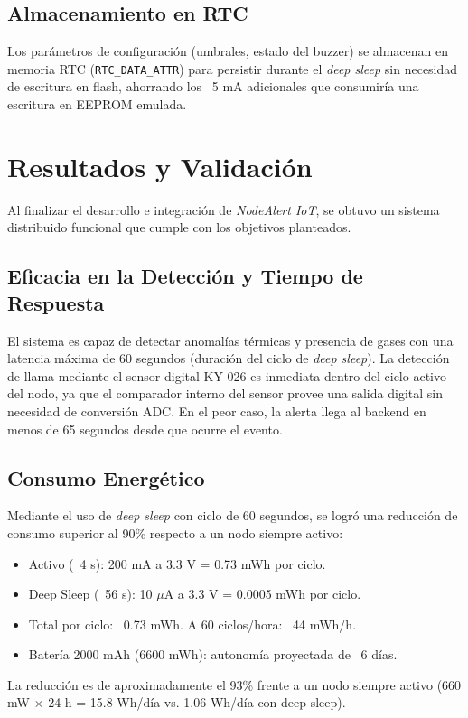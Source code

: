 \documentclass[11pt,a4paper]{article}
\begin{document}
\subsection{Almacenamiento en RTC}
Los parámetros de configuración (umbrales, estado del buzzer) se almacenan en memoria RTC (\texttt{RTC\_DATA\_ATTR}) para persistir durante el \textit{deep sleep} sin necesidad de escritura en flash, ahorrando los ~5 mA adicionales que consumiría una escritura en EEPROM emulada.

\section{Resultados y Validación}

Al finalizar el desarrollo e integración de \textit{NodeAlert IoT}, se obtuvo un sistema distribuido funcional que cumple con los objetivos planteados.

\subsection{Eficacia en la Detección y Tiempo de Respuesta}
El sistema es capaz de detectar anomalías térmicas y presencia de gases con una latencia máxima de 60 segundos (duración del ciclo de \textit{deep sleep}). La detección de llama mediante el sensor digital KY-026 es inmediata dentro del ciclo activo del nodo, ya que el comparador interno del sensor provee una salida digital sin necesidad de conversión ADC. En el peor caso, la alerta llega al backend en menos de 65 segundos desde que ocurre el evento.

\subsection{Consumo Energético}
Mediante el uso de \textit{deep sleep} con ciclo de 60 segundos, se logró una reducción de consumo superior al 90\% respecto a un nodo siempre activo:
\begin{itemize}
    \item Activo (~4 s): 200 mA a 3.3 V = 0.73 mWh por ciclo.
    \item Deep Sleep (~56 s): 10 $\mu$A a 3.3 V = 0.0005 mWh por ciclo.
    \item Total por ciclo: ~0.73 mWh. A 60 ciclos/hora: ~44 mWh/h.
    \item Batería 2000 mAh (6600 mWh): autonomía proyectada de ~6 días.
\end{itemize}
La reducción es de aproximadamente el 93\% frente a un nodo siempre activo (660 mW $\times$ 24 h = 15.8 Wh/día vs. 1.06 Wh/día con deep sleep).
\end{document}
